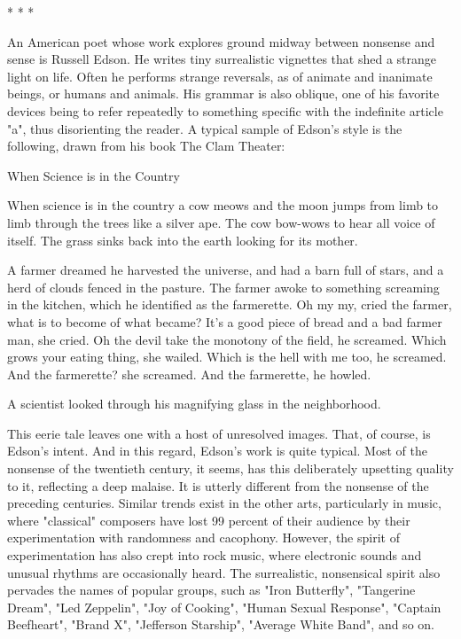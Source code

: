                                             *   *   *

        An American poet whose work explores ground midway between nonsense and
sense is Russell Edson. He writes tiny surrealistic vignettes that shed a strange light on
life. Often he performs strange reversals, as of animate and inanimate beings, or humans
and animals. His grammar is also oblique, one of his favorite devices being to refer
repeatedly to something specific with the indefinite article "a", thus disorienting the
reader. A typical sample of Edson's style is the following, drawn from his book The Clam
Theater:





       When Science is in the Country

       When science is in the country a cow meows and the moon jumps from limb to
limb through the trees like a silver ape.
       The cow bow-wows to hear all voice of itself. The grass sinks back into the earth
looking for its mother.

        A farmer dreamed he harvested the universe, and had a barn full of stars, and a
herd of clouds fenced in the pasture.
        The farmer awoke to something screaming in the kitchen, which he identified as
the farmerette.
        Oh my my, cried the farmer, what is to become of what became?
        It's a good piece of bread and a bad farmer man, she cried.
        Oh the devil take the monotony of the field, he screamed.
        Which grows your eating thing, she wailed.
        Which is the hell with me too, he screamed.
        And the farmerette? she screamed.
        And the farmerette, he howled.

       A scientist looked through his magnifying glass in the neighborhood.

        This eerie tale leaves one with a host of unresolved images. That, of course, is
Edson's intent. And in this regard, Edson's work is quite typical. Most of the nonsense of
the twentieth century, it seems, has this deliberately upsetting quality to it, reflecting a
deep malaise. It is utterly different from the nonsense of the preceding centuries. Similar
trends exist in the other arts, particularly in music, where "classical" composers have lost
99 percent of their audience by their experimentation with randomness and cacophony.
However, the spirit of experimentation has also crept into rock music, where electronic
sounds and unusual rhythms are occasionally heard. The surrealistic, nonsensical spirit
also pervades the names of popular groups, such as "Iron Butterfly", "Tangerine Dream",
"Led Zeppelin", "Joy of Cooking", "Human Sexual Response", "Captain Beefheart",
"Brand X", "Jefferson Starship", "Average White Band", and so on.

